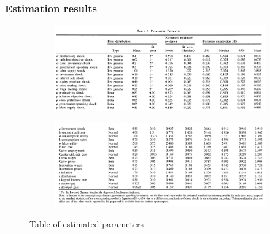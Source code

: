 \documentclass{article}
\begin{document}
\subsubsection{Estimation results}

\begin{figure}[H]  
  \centering    
  \begin{subfigure}[b]{0.9\textwidth}    
    \centering    
    \includegraphics[width=\textwidth]{Pictures/Screenshot 2025-03-26 at 7.32.52 PM.png}    
    \label{fig:image1}    
  \end{subfigure}    
  \begin{subfigure}[b]{0.9\textwidth}    
    \hspace*{-0.007\textwidth}    
    \includegraphics[width=\textwidth]{Pictures/Screenshot 2025-03-26 at 7.33.29 PM.png}    
    \label{fig:image2}    
  \end{subfigure}    
  \caption{Table of estimated parameters}  
  \label{fig:merged_images}  
\end{figure}  
\end{document}

